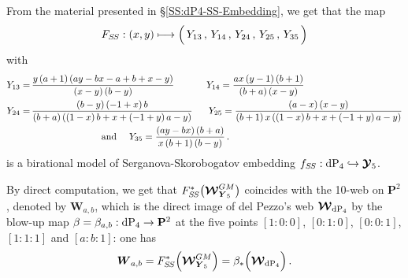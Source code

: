 \documentclass[11pt]{amsart}
\begin{document}
From the material presented in \S\ref{SS:dP4-SS-Embedding}, we get that the map 
\begin{equation}%
\label{Eq:F-SS}%
F_{S\hspace{-0.03cm}S} : (x,y)\longmapsto \Big( \, Y_{13}\, , \, Y_{14}\, , \, 
Y_{24}\, , \,
Y_{25}\, , \,
Y_{35}\, \Big)
\end{equation}%
with 
\begin{align*}%
 {Y_{13}} =  &\, 
\frac{y \left(a +1\right)\left(a y -b x -a +b +x -y \right) }{\left(x -y \right) \left(b -y \right)}
\hspace{1.2cm}  {Y_{14}} = 
\frac{a x \left(y-1 \right)  \left(b +1\right)}{\left(b +a \right) \left(x -y \right)}
\\  {Y_{24}} = &\, 
\frac{\left(b -y \right) \left(-1+x \right) b}{\left(b +a \right) \left(\left(1-x \right) b +x +\left(-1+y \right) a -y \right)}
\hspace{0.6cm} 
 {Y_{25}} = 
\frac{\left(a -x \right) \left(x -y \right)}{\left(b +1\right) x \left(\left(1-x \right) b +x +\left(-1+y \right) a -y \right)} \\
& \, \hspace{2.6cm}
 \mbox{and } \quad   {Y_{35}} = \frac{\left(a y -b x \right) \left(b +a \right)}{x \left(b +1\right) \left(b -y \right)}\, . 
\end{align*}%
is a birational model of Serganova-Skorobogatov embedding $f_{S\hspace{-0.03cm}S}: {\rm dP}_4\hookrightarrow \boldsymbol{\mathcal Y}_5$. 

By direct computation, we get that $F_{S\hspace{-0.03cm}S}^*\big( \boldsymbol{\mathcal W}^{GM}_{ \boldsymbol{Y}_5}\big)$ coincides with the 10-web on $\mathbf P^2$, denoted by $ \boldsymbol{W}_{a,b}$, which is the direct image of del Pezzo's web $\boldsymbol{\mathcal W}_{ {\rm dP}_4 }$
by the blow-up map $\beta=\beta_{a,b} : {\rm dP}_4\rightarrow \mathbf P^2$
at 
the five points 
$[1:0:0]$, $[0:1:0]$, $[0:0:1]$, $[1:1:1]$ and $[a:b:1]$: 
one has 
\begin{equation} 
\label{Eq:Web-above}
 \boldsymbol{W}_{a,b}=F_{S\hspace{-0.03cm}S}^*\Big( \boldsymbol{\mathcal W}^{GM}_{ \boldsymbol{Y}_5}\Big)=\beta_*\Big( \boldsymbol{\mathcal W}_{ {\rm dP}_4 }\Big)\, .
\end{equation} %
\end{document}
